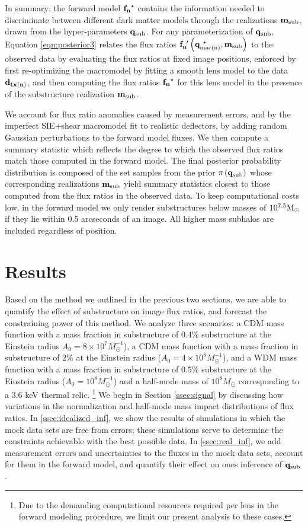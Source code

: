 In summary: the forward model ${\bf{f_n}^{\star}}$ contains the information needed to discriminate between different dark matter models through the realizations ${\bf{m}_{\rm{sub}}}$, drawn from the hyper-parameters ${\bf{q}_{\rm{sub}}}$. For any parameterization of ${\bf{q}_{\rm{sub}}}$, Equation \ref{eqn:posterior3} relates the flux ratios ${\bf{f}_{n}^{\ \prime}}\left({\bf{q}_{\rm{mac(n)}}^{\ \star}},{\bf{m}_{\rm{sub}}}\right)$ to the observed data by evaluating the flux ratios at fixed image positions, enforced by first re-optimizing the macromodel by fitting a smooth lens model to the data ${\bf{d}_{tx(n)}}$, and then computing the flux ratios ${\bf{f_n}^{\star}}$ for this lens model in the presence of the substructure realization ${\bf{m}_{\rm{sub}}}$. 

We account for flux ratio anomalies caused by measurement errors, and by the imperfect SIE+shear macromodel fit to realistic deflectors, by adding random Gaussian perturbations to the forward model fluxes. We then compute a summary statistic which reflects the degree to which the observed flux ratios match those computed in the forward model. The final posterior probability distribution is composed of the set samples from the prior $\pi\left({\bf{q}_{\rm{sub}}}\right)$ whose corresponding realizations ${\bf{m}_{\rm{sub}}}$ yield summary statistics closest to those computed from the flux ratios in the observed data. To keep computational costs low, in the forward model we only render substructures below masses of $10^{7.5} {\rm{M}_{\odot}}$ if they lie within 0.5 arcseconds of an image. All higher mass subhalos are included regardless of position.

\section{Results}
\label{sec:results}

Based on the method we outlined in the previous two sections, we are able to quantify the effect of substructure on image flux ratios, and forecast the constraining power of this method. We analyze three scenarios: a CDM mass function with a mass fraction in substructure of $0.4\%$ substructure at the Einstein radius $A_0 = 8 \times 10^7 M_{\odot}^{-1}$), a CDM mass function with a mass fraction in substructure of $2\%$ at the Einstein radius ($A_0 = 4 \times 10^8 M_{\odot}^{-1}$), and a WDM mass function with a mass fraction in substructure of $0.5\%$ substructure at the Einstein radius ($A_0 = 10^8 M_{\odot}^{-1}$) and a half-mode mass of $10^8 M_{\odot}$ corresponding to a 3.6 keV thermal relic. \footnote{Due to the demanding computational resources required per lens in the forward modeling procedure, we limit our present analysis to these cases.} We begin in Section \ref{ssec:signal} by discussing how variations in the normalization and half-mode mass impact distributions of flux ratios. In \ref{ssec:idealized_inf}, we show the results of simulations in which the mock data sets are free from errors; these simulations serve to determine the constraints achievable with the best possible data. In \ref{ssec:real_inf}, we add measurement errors and uncertainties to the fluxes in the mock data sets, account for them in the forward model, and quantify their effect on ones inference of ${\bf{q}_{\rm{sub}}}$. 

